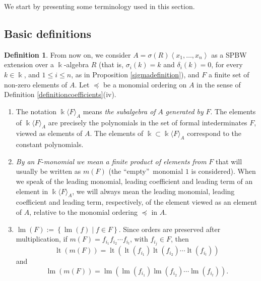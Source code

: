 \documentclass{amsart}
\theoremstyle{definition}
\newtheorem{definition}[theorem]{Definition}
\theoremstyle{remark}
\numberwithin{equation}{section}
\begin{document}
We start by presenting some terminology used in this section.

\subsection{Basic definitions}\label{SPBWSAGBIBasicDefinitions}

\begin{definition}
From now on, we consider $A=\sigma(R)\left\langle x_{1}, \dotsc, x_{n}\right\rangle$ as a SPBW extension over a $\Bbbk$-algebra $R$ (that is, $\sigma_{i}(k)=k$ and $\delta_{i}(k)=0$, for every $k \in \Bbbk$, and $1 \leq i \leq n$, as in Proposition \ref{sigmadefinition}), and $F$ a finite set of non-zero elements of $A$. Let $\preceq$ be a monomial ordering on $A$ in the sense of Definition \ref{definitioncoefficients}(iv).
\begin{enumerate}
\item[\rm (i)] The notation $\Bbbk\langle F\rangle_{A}$ means {\em the subalgebra of} $A$ {\em generated by} $F$. The elements of $\Bbbk\langle F\rangle_{A}$ are precisely the polynomials in the set of formal intederminates $F$, viewed as elements of $A$. The elements of $\Bbbk \subset \Bbbk\langle F\rangle_{A}$ correspond to the constant polynomials. 

\item[\rm (ii)] {\em By an} $F$-{\em monomial} {\em we mean a finite product of elements from} $F$ that will usually be written as $m(F)$ (the \textquotedblleft empty\textquotedblright\ monomial $1$ is considered). When we speak of the leading monomial, leading coefficient and leading term of an element in $\Bbbk\langle F\rangle_{A}$, we will always mean the leading monomial, leading coefficient and leading term, respectively, of the element viewed as an element of $A$, relative to the monomial ordering $\preceq$ in $A$.

\item[\rm (iii)] $\operatorname{lm}(F):=\left\{\operatorname{lm}(f) \mid f \in F\right\}$. Since orders are preserved after multiplication, if $m(F) = f_{i_ 1} f_{i_ 2} \cdots f_{i_ t}$, with $f_{i_j}\in F$, then $$\operatorname{lt}(m(F))= \operatorname{lt}\left(\operatorname{lt}\left(f_{i_ 1}\right) \operatorname{lt}\left(f_{i_ 2}\right) \cdots \operatorname{lt}\left(f_{i_ t}\right)\right)$$ and $$ \operatorname{lm}(m(F))= \operatorname{lm}\left(\operatorname{lm}\left(f_{i_ 1}\right) \operatorname{lm}\left(f_{i_ 2}\right) \cdots \operatorname{lm}\left(f_{i_ t}\right)\right).$$
\end{enumerate}
\end{definition}
\end{document}
